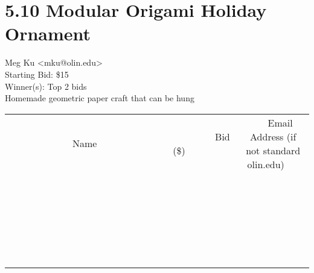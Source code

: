 \documentclass[11pt]{article}
\begin{document}
					\section*{5.10 Modular Origami Holiday Ornament}
					Meg Ku <mku@olin.edu> \\
					Starting Bid: \$15 \\
					Winner(s): Top 2 bids \\
					Homemade geometric paper craft that can be hung \\
					[6ex]
					\begin{tabular}{c c c}
						~~~~~~~~~~~~~Name~~~~~~~~~~~~~ & ~~~~~~~~~Bid (\$)~~~~~~~~~ & ~~~Email Address (if not standard olin.edu)~~~ \\
				
 & & \\
\hline
 & & \\
\hline
 & & \\
\hline
 & & \\
\hline
 & & \\
\hline
 & & \\
\hline
 & & \\
\hline
 & & \\
\hline
 & & \\
\hline
 & & \\
\hline
 & & \\
\hline
 & & \\
\hline
 & & \\
\hline
 & & \\
\hline
 & & \\
\hline
 & & \\
\hline
 & & \\
\hline
 & & \\
\hline
 & & \\
\hline
 & & \\
\hline
 & & \\
\hline
 & & \\
\hline
 & & \\
\hline
 & & \\
\hline
 & & \\
\hline
 & & \\
\hline
					\end{tabular}
					\clearpage
				
\end{document}

